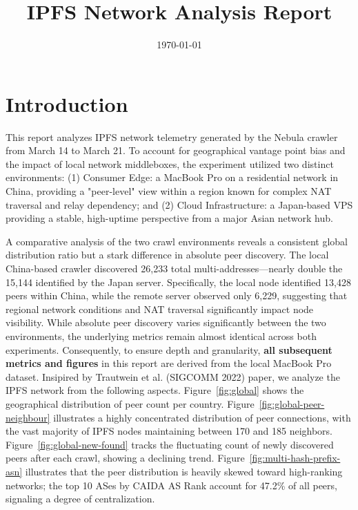 \documentclass[10pt,a4paper,twocolumn]{article}
\title{IPFS Network Analysis Report}
\author{}
\date{\today}
\begin{document}
\maketitle

\section{Introduction}

This report analyzes IPFS network telemetry generated by the Nebula crawler from March 14 to March 21. To account for geographical vantage point bias and the impact of local network middleboxes, the experiment utilized two distinct environments: (1) Consumer Edge: a MacBook Pro on a residential network in China, providing a "peer-level" view within a region known for complex NAT traversal and relay dependency; and (2) Cloud Infrastructure: a Japan-based VPS providing a stable, high-uptime perspective from a major Asian network hub.

A comparative analysis of the two crawl environments reveals a consistent global distribution ratio but a stark difference in absolute peer discovery. The local China-based crawler discovered 26,233 total multi-addresses—nearly double the 15,144 identified by the Japan server. Specifically, the local node identified 13,428 peers within China, while the remote server observed only 6,229, suggesting that regional network conditions and NAT traversal significantly impact node visibility.
While absolute peer discovery varies significantly between the two environments, the underlying metrics remain almost identical across both experiments. Consequently, to ensure depth and granularity, \textbf{all subsequent metrics and figures} in this report are derived from the local MacBook Pro dataset.
Insipired by Trautwein et al. (SIGCOMM 2022) paper, we analyze the IPFS network from the following aspects. Figure~\ref{fig:global} shows the geographical distribution of peer count per country. 
Figure~\ref{fig:global-peer-neighbour}  illustrates a highly concentrated distribution of peer connections, with the vast majority of IPFS nodes maintaining between 170 and 185 neighbors.
Figure~\ref{fig:global-new-found} tracks the fluctuating count of newly discovered peers after each crawl, showing a declining trend.
Figure~\ref{fig:multi-hash-prefix-asn} illustrates that the peer distribution is heavily skewed toward high-ranking networks; the top 10 ASes by CAIDA AS Rank account for 47.2\% of all peers, signaling a degree of centralization.
\mbox{} %
\end{document}
